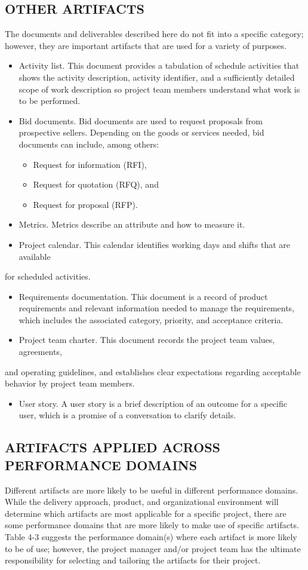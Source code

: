 \documentclass[11pt]{article}
\begin{document}
\subsection{OTHER ARTIFACTS}
\label{sec:org4ecc1f3}
The documents and deliverables described here do not fit into a specific category; however, they are important artifacts that are used for a variety of purposes.
\begin{itemize}
\item Activity list. This document provides a tabulation of schedule activities that shows the activity description, activity identifier, and a sufficiently detailed scope of work description so project team members understand what work is to be performed.
\item Bid documents. Bid documents are used to request proposals from prospective sellers. Depending on the goods or services needed, bid documents can include, among others:
\begin{itemize}
\item Request for information (RFI),
\item Request for quotation (RFQ), and
\item Request for proposal (RFP).
\end{itemize}
\item Metrics. Metrics describe an attribute and how to measure it.
\item Project calendar. This calendar identifies working days and shifts that are available
\end{itemize}
for scheduled activities.
\begin{itemize}
\item Requirements documentation. This document is a record of product requirements and relevant information needed to manage the requirements, which includes the associated category, priority, and acceptance criteria.
\item Project team charter. This document records the project team values, agreements,
\end{itemize}
and operating guidelines, and establishes clear expectations regarding acceptable behavior by project team members.
\begin{itemize}
\item User story. A user story is a brief description of an outcome for a specific user, which is a promise of a conversation to clarify details.
\end{itemize}

\subsection{ARTIFACTS APPLIED ACROSS PERFORMANCE DOMAINS}
\label{sec:orgf18aab3}
Different artifacts are more likely to be useful in different performance domains. While the delivery approach, product, and organizational environment will determine which artifacts are most applicable for a specific project, there are some performance domains that are more likely to make use of specific artifacts. Table 4-3 suggests the performance domain(s) where each artifact is more likely to be of use; however, the project manager and/or project team has the ultimate responsibility for selecting and tailoring the artifacts for their project.
\end{document}
